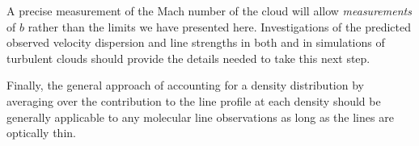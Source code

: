 A precise measurement of the Mach number of the cloud will allow
\emph{measurements} of $b$ rather than the limits we have presented here.
Investigations of the predicted observed velocity dispersion and line strengths
in both \formaldehyde and \thirteenco in simulations of turbulent clouds should
provide the details needed to take this next step.

Finally, the general approach of accounting for a density distribution by
averaging over the contribution to the line profile at each density should be
generally applicable to any molecular line observations as long as the lines
are optically thin.


% 
% 
% 
% 

